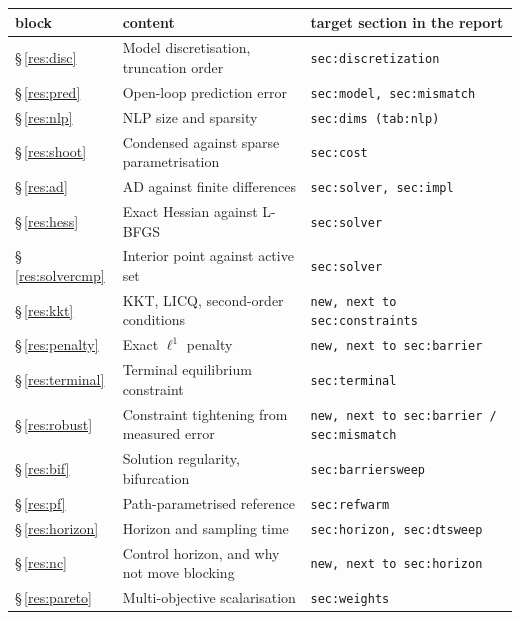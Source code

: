 \begin{tabular}{llp{}}
  \toprule
  block & content & target section in the report \\
  \midrule
  \S\,\ref{res:disc} & Model discretisation, truncation order & \texttt{sec:discretization} \\
  \S\,\ref{res:pred} & Open-loop prediction error & \texttt{sec:model, sec:mismatch} \\
  \S\,\ref{res:nlp} & NLP size and sparsity & \texttt{sec:dims (tab:nlp)} \\
  \S\,\ref{res:shoot} & Condensed against sparse parametrisation & \texttt{sec:cost} \\
  \S\,\ref{res:ad} & AD against finite differences & \texttt{sec:solver, sec:impl} \\
  \S\,\ref{res:hess} & Exact Hessian against L-BFGS & \texttt{sec:solver} \\
  \S\,\ref{res:solvercmp} & Interior point against active set & \texttt{sec:solver} \\
  \S\,\ref{res:kkt} & KKT, LICQ, second-order conditions & \texttt{new, next to sec:constraints} \\
  \S\,\ref{res:penalty} & Exact $\ell^1$ penalty & \texttt{new, next to sec:barrier} \\
  \S\,\ref{res:terminal} & Terminal equilibrium constraint & \texttt{sec:terminal} \\
  \S\,\ref{res:robust} & Constraint tightening from measured error & \texttt{new, next to sec:barrier / sec:mismatch} \\
  \S\,\ref{res:bif} & Solution regularity, bifurcation & \texttt{sec:barriersweep} \\
  \S\,\ref{res:pf} & Path-parametrised reference & \texttt{sec:refwarm} \\
  \S\,\ref{res:horizon} & Horizon and sampling time & \texttt{sec:horizon, sec:dtsweep} \\
  \S\,\ref{res:nc} & Control horizon, and why not move blocking & \texttt{new, next to sec:horizon} \\
  \S\,\ref{res:pareto} & Multi-objective scalarisation & \texttt{sec:weights} \\
  \bottomrule
\end{tabular}
